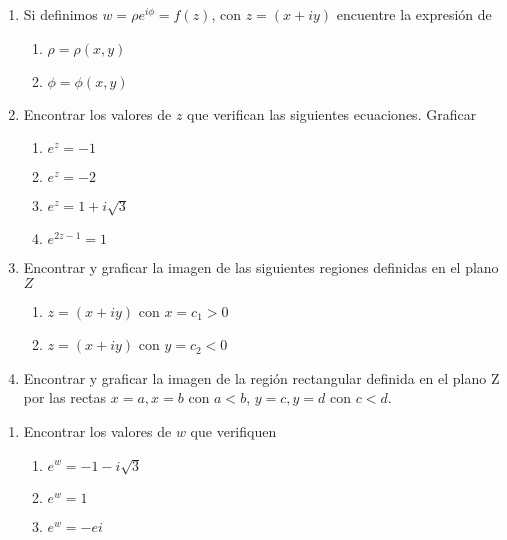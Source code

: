 \documentclass[12pt]{article}
\begin{document}
\begin{enumerate}
\item Si definimos $w = \rho e^{i\phi} = f(z)$, con $z=(x+iy)$ encuentre la expresión de
\begin{enumerate}
\item $\rho = \rho(x,y)$
\item $\phi = \phi(x,y)$
\end{enumerate} 
\item Encontrar los valores de $z$ que verifican las siguientes ecuaciones. Graficar
\begin{enumerate}
\item $e^z=-1$
\item $e^z=-2$
\item $e^z=1+i\sqrt{3}$
\item $e^{2z-1}=1$
\end{enumerate}
\item Encontrar y graficar la imagen de las siguientes regiones definidas en el plano $Z$
\begin{enumerate}
\item $z=(x+iy)$ con $x=c_1 > 0$
\item $z=(x+iy)$ con $y=c_2 < 0$
\end{enumerate}
\item Encontrar y graficar la imagen de la región rectangular definida en el plano Z por las rectas $x=a, x=b$ con $ a<b $, $y=c, y=d$ con $c<d$. 
\end{enumerate}

\begin{enumerate}
\item Encontrar los valores de $w$ que verifiquen
\begin{enumerate}
\item $e^w=-1-i\sqrt{3}$
\item $e^w=1$
\item $e^w=-ei$
\end{enumerate}
\end{enumerate}
\end{document}
